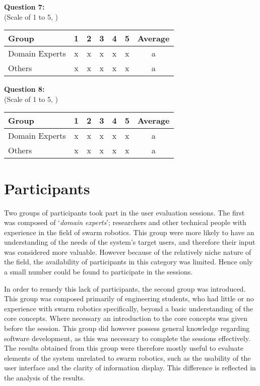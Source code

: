 \noindent\textbf{Question 7: }\\(Scale of 1 to 5, )

\begin{center}
\begin{tabular}{ l c c c c c c }
 Group & 1 & 2 & 3 & 4 & 5 & Average \\ 
 \hline
 Domain Experts & x & x & x & x & x & a \\
 Others 		& x & x & x & x & x & a \\
\end{tabular}
\end{center}

\noindent\textbf{Question 8: }\\(Scale of 1 to 5, )

\begin{center}
\begin{tabular}{ l c c c c c c }
 Group & 1 & 2 & 3 & 4 & 5 & Average \\ 
 \hline
 Domain Experts & x & x & x & x & x & a \\
 Others 		& x & x & x & x & x & a \\
\end{tabular}
\end{center}


\section{Participants}

Two groups of participants took part in the user evaluation sessions. The first was composed of `\textit{domain experts}'; researchers and other technical people with experience in the field of swarm robotics. This group were more likely to have an understanding of the needs of the system's target users, and therefore their input was considered more valuable. However because of the relatively niche nature of the field, the availability of participants in this category was limited. Hence only a small number could be found to participate in the sessions.

In order to remedy this lack of participants, the second group was introduced. This group was composed primarily of engineering students, who had little or no experience with swarm robotics specifically, beyond a basic understanding of the core concepts. Where necessary an introduction to the core concepts was given before the session. This group did however possess general knowledge regarding software development, as this was necessary to complete the sessions effectively. The results obtained from this group were therefore mostly useful to evaluate elements of the system unrelated to swarm robotics, such as the usability of the user interface and the clarity of information display. This difference is reflected in the analysis of the results.

